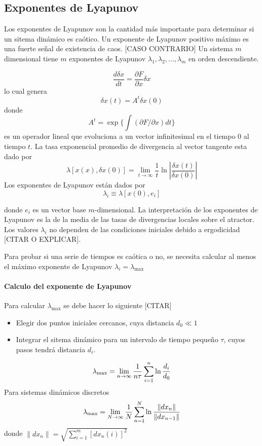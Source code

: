 \documentclass[12pt]{book}
\begin{document}
\subsection{Exponentes de Lyapunov}
Los exponentes de Lyapunov son la cantidad más importante para determinar si un
sitema dinámico es caótico.  Un exponente de Lyapunov positivo máximo es una
fuerte señal de existencia de caos. [CASO CONTRARIO]
Un sistema $m$ dimensional tiene $m$ exponentes de Lyapunov $\lambda_1,
\lambda_2, \ldots, \lambda_m$ en orden descendiente.

$$
	\frac{d\delta x}{dt} = \frac{ \partial F }{ \partial x}  \delta x
$$
lo cual genera
$$
	\delta x(t) = A^t \delta x(0)
$$
donde 
$$
	A^t = \exp \{ \textstyle \int (\partial F/\partial x)dt \}
$$
es un operador lineal que evoluciona a un vector infinitesimal en el tiempo $0$
al tiempo $t$. La tasa exponencial promedio de divergencia al vector tangente
esta dado por
$$
	\lambda [ x(x), \delta x(0) ] = \lim_{t \rightarrow \infty} \frac{1}{t}
\ln  \left\lvert \frac{\delta x(t)}{\delta x(0)} \right\rvert
$$
Los exponentes de Lyapunov están dados por
$$
	\lambda_i \equiv \lambda[ x(0), e_i]
$$

donde $e_i$ es un vector base $m$-dimensional. La interpretación de los
exponentes de Lyapunov es la de la media de las tasas de divergencias locales
sobre el atractor. Los valores $\lambda_i$ no dependen de las condiciones
iniciales debido a ergodicidad [CITAR O EXPLICAR].

Para probar si una serie de tiempos es caótica o no, se necesita calcular al
menos el máximo exponente de Lyapunov $\lambda_i = \lambda_{\text{max}}$

\paragraph{Calculo del exponente de Lyapunov} Para calcular
$\lambda_{\text{max}}$ se debe hacer lo siguiente [CITAR]
\begin{itemize}
	\item Elegir dos puntos iniciales cercanos, cuya distancia $d_0 \ll 1$
	\item Integrar el sitema dinámico para un intervalo de tiempo pequeño
$\tau$, cuyos pasos tendrá distancia $d_i$.
\end{itemize}
$$
	\lambda_{\max}=\lim_{n\rightarrow\infty} \frac{1}{n\tau}\sum_{i=1}^{n}
\ln\frac{d_i}{d_0}
$$
Para sistemas dinámicos discretos
$$
	\lambda_{\max} = \lim_{N\rightarrow\infty} \frac{1}{N}
\sum_{n=1}^{N}\ln\frac{\|dx_n\|}{\|dx_{n-1}\|}
$$
donde $\|dx_n\| = \sqrt{\sum_{i=1}^{m}[dx_n(i)]^2}$
\end{document}
